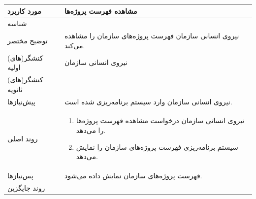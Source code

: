\begin{table}[H]
	\centering
	\begin{tabular}{|p{3cm}|p{10cm}|}
		\hline
		
		مورد کاربرد & مشاهده فهرست پروژه‌ها  \\
		\hline
		
		شناسه & 
		\stepcounter{usecase_ID}
		
		\arabic{usecase_ID} \\
		\hline
		
		توضیح مختصر & نیروی انسانی سازمان فهرست پروژه‌های سازمان را مشاهده می‌کند. \\
		\hline
		
		کنشگر(های) اولیه & نیروی انسانی سازمان \\
		\hline
		
		کنشگر(های) ثانویه &  \\
		\hline
		
		پیش‌نیازها & نیروی انسانی سازمان وارد سیستم برنامه‌ریزی شده است. \\
		\hline
		
		
		روند اصلی &
		\begin{enumerate}[topsep=0cm,leftmargin=0.5cm]
			
			\item نیروی انسانی سازمان درخواست مشاهده فهرست پروژه‌ها را می‌دهد.
			\item سیستم برنامه‌ریزی فهرست پروژه‌های سازمان را نمایش می‌دهد.
		\end{enumerate} \\
		
		\hline
		
		پس‌نیازها & فهرست پروژه‌های سازمان نمایش داده می‌شود. \\
		\hline
		
		روند جایگزین &  \\
		\hline
		
	\end{tabular}
\end{table}


